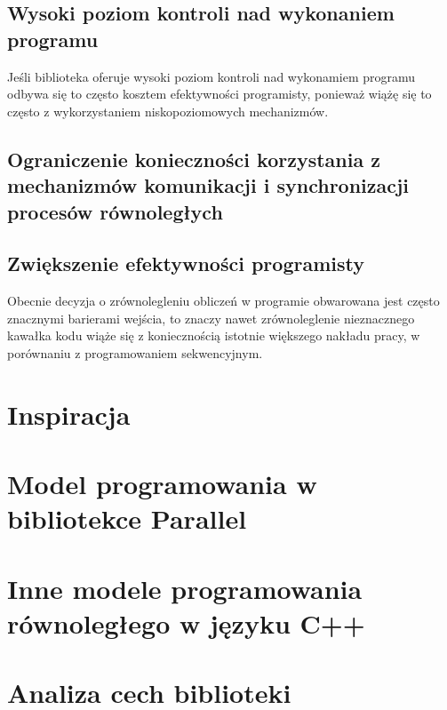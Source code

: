 \subsection{Wysoki poziom kontroli nad wykonaniem programu}

  Jeśli biblioteka oferuje wysoki poziom kontroli nad wykonamiem programu odbywa się to często kosztem efektywności programisty, ponieważ wiążę się to często z wykorzystaniem niskopoziomowych mechanizmów.
  

\subsection{Ograniczenie konieczności korzystania z mechanizmów komunikacji i synchronizacji procesów równoległych}

\subsection{Zwiększenie efektywności programisty}
  Obecnie decyzja o zrównolegleniu obliczeń w programie obwarowana jest często znacznymi barierami wejścia, 
  to znaczy nawet zrównoleglenie nieznacznego kawałka kodu wiąże się z koniecznością istotnie większego nakładu pracy, w porównaniu z programowaniem sekwencyjnym.

\section{Inspiracja}

\section{Model programowania w bibliotekce Parallel}

\section{Inne modele programowania równoległego w języku C++}

\section{Analiza cech biblioteki}